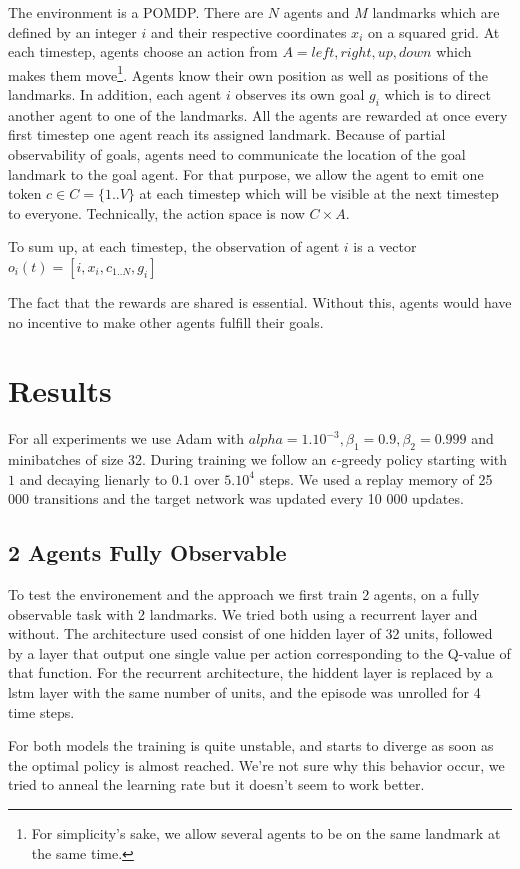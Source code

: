 \documentclass{article} %
\begin{document}
The environment is a POMDP. There are $N$ agents and $M$ landmarks which are defined by an integer $i$ and their respective coordinates $x_i$ on a squared grid. At each timestep, agents choose an action from $A={left, right, up, down}$ which makes them move\footnote{For simplicity's sake, we allow several agents to be on the same landmark at the same time.}. Agents know their own position as well as positions of the landmarks. In addition, each agent $i$ observes its own goal $g_i$ which is to direct another agent to one of the landmarks. All the agents are rewarded at once every first timestep one agent reach its assigned landmark. Because of partial observability of goals, agents need to communicate the location of the goal landmark to the goal agent. For that purpose, we allow the agent to emit one token $c \in C = \{1..V\}$ at each timestep which will be visible at the next timestep to everyone. Technically, the action space is now $C \times A$.

To sum up, at each timestep, the observation of agent $i$ is a vector $o_i(t) = [i, x_i, c_{1..N}, g_i]$

The fact that the rewards are shared is essential. Without this, agents would have no incentive to make other agents fulfill their goals.

\section{Results}
For all experiments we use Adam \cite{kingma2014adam} with $alpha=1.10^{-3}, \beta_1=0.9, \beta_2=0.999$ and minibatches of size 32. During training we follow an $\epsilon$-greedy policy starting with $1$ and decaying lienarly to $0.1$ over $5.10^4$ steps. We used a replay memory of 25 000 transitions and the target network was updated every 10 000 updates.
\subsection{2 Agents Fully Observable}
To test the environement and the approach we first train 2 agents, on a fully observable task with 2 landmarks.
We tried both using a recurrent layer and without. The architecture used  consist of one hidden layer of 32 units, followed by a layer that output one single value per action corresponding to the Q-value of that function. For the recurrent architecture, the hiddent layer is replaced by a lstm layer with the same number of units, and the episode was unrolled for 4 time steps.

For both models the training is quite unstable, and starts to diverge as soon as the optimal policy is almost reached. We're not sure why this behavior occur, we tried to anneal the learning rate but it doesn't seem to work better.
\end{document}
